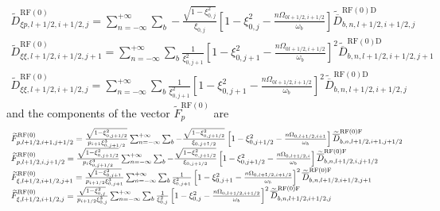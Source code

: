 \begin{equation}
\begin{array}{l}
\widetilde{D}_{\xi p,l+1/2,i+1/2,j}^{\text{RF}\left( 0\right) }=\sum_{n=-%
\infty }^{+\infty }\sum_{b}-\frac{\sqrt{1-\xi _{0,j}^{2}}}{\xi _{0,j}}\left[
1-\xi _{0,j}^{2}-\frac{n\Omega _{0l+1/2,i+1/2}}{\omega _{b}}\right]
\widetilde{\overline{D}}_{b,n,l+1/2,i+1/2,j}^{\text{RF}(0)\text{D}} \\
\widetilde{D}_{\xi \xi ,l+1/2,i+1/2,j+1}^{\text{RF}\left( 0\right)
}=\sum_{n=-\infty }^{+\infty }\sum_{b}\frac{1}{\xi _{0,j+1}^{2}}\left[ 1-\xi
_{0,j+1}^{2}-\frac{n\Omega _{0l+1/2,i+1/2}}{\omega _{b}}\right] ^{2}%
\widetilde{\overline{D}}_{b,n,l+1/2,i+1/2,j+1}^{\text{RF}(0)\text{D}} \\
\widetilde{D}_{\xi \xi ,l+1/2,i+1/2,j}^{\text{RF}\left( 0\right) }=\sum_{n=-%
\infty }^{+\infty }\sum_{b}\frac{1}{\xi _{0,j+1}^{2}}\left[ 1-\xi
_{0,j+1}^{2}-\frac{n\Omega _{0l+1/2,i+1/2}}{\omega _{b}}\right] ^{2}%
\widetilde{\overline{D}}_{b,n,l+1/2,i+1/2,j}^{\text{RF}(0)\text{D}}
\end{array}
\end{equation}
and the components of the vector
$\widetilde{F}_{p}^{\text{RF}\left( 0\right) }$ are
\begin{equation}
\begin{array}{l}
\widetilde{F}_{p,l+1/2,i+1,j+1/2}^{\text{RF}\left( 0\right) }=\frac{\sqrt{%
1-\xi _{0,j+1/2}^{2}}}{p_{i+1}\xi _{0,j+1/2}^{3}}\sum_{n=-\infty }^{+\infty %
}\sum_{b}-\frac{\sqrt{1-\xi _{0,j+1/2}^{2}}}{\xi _{0,j+1/2}}\left[ 1-\xi
_{0,j+1/2}^{2}-\frac{n\Omega _{0,l+1/2,i+1}}{\omega _{b}}\right] \widetilde{%
\overline{D}}_{b,n,l+1/2,i+1,j+1/2}^{\text{RF}(0)\text{F}} \\
\widetilde{F}_{p,l+1/2,i,j+1/2}^{\text{RF}\left( 0\right) }=\frac{\sqrt{%
1-\xi _{0,j+1/2}^{2}}}{p_{i}\xi _{0,j+1/2}^{3}}\sum_{n=-\infty }^{+\infty %
}\sum_{b}-\frac{\sqrt{1-\xi _{0,j+1/2}^{2}}}{\xi _{0,j+1/2}}\left[ 1-\xi
_{0,j+1/2}^{2}-\frac{n\Omega _{0,l+1/2,i}}{\omega _{b}}\right] \widetilde{%
\overline{D}}_{b,n,l+1/2,i,j+1/2}^{\text{RF}(0)\text{F}} \\
\widetilde{F}_{\xi ,l+1/2,i+1/2,j+1}^{\text{RF}\left( 0\right) }=\frac{\sqrt{%
1-\xi _{0,j+1}^{2}}}{p_{i+1/2}\xi _{0,j+1}^{3}}\sum_{n=-\infty }^{+\infty %
}\sum_{b}\frac{1}{\xi _{0,j+1}^{2}}\left[ 1-\xi _{0,j+1}^{2}-\frac{n\Omega %
_{0,l+1/2,i+1/2}}{\omega _{b}}\right] ^{2}\widetilde{\overline{D}}%
_{b,n,l+1/2,i+1/2,j+1}^{\text{RF}(0)\text{F}} \\
\widetilde{F}_{\xi ,l+1/2,i+1/2,j}^{\text{RF}\left( 0\right) }=\frac{\sqrt{%
1-\xi _{0,j}^{2}}}{p_{i+1/2}\xi _{0,j}^{3}}\sum_{n=-\infty }^{+\infty %
}\sum_{b}\frac{1}{\xi _{0,j}^{2}}\left[ 1-\xi _{0,j}^{2}-\frac{n\Omega %
_{0,l+1/2,i+1/2}}{\omega _{b}}\right] ^{2}\widetilde{\overline{D}}%
_{b,n,l+1/2,i+1/2,j}^{\text{RF}(0)\text{F}}
\end{array}
\end{equation}
